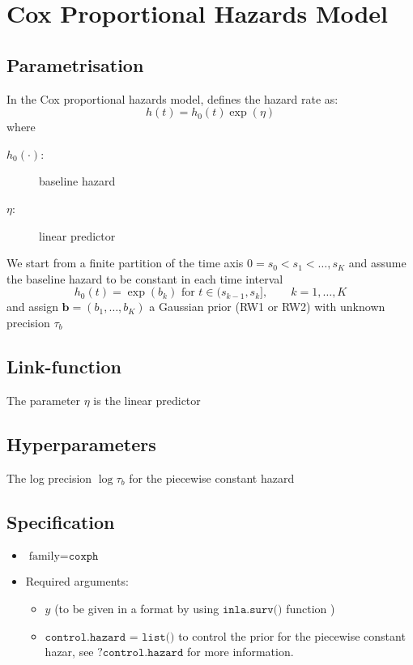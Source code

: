 \documentclass[a4paper,11pt]{article}
\begin{document}
\section*{Cox Proportional Hazards Model}

\subsection*{Parametrisation}

In the Cox proportional hazards model, defines the hazard rate as:
\begin{displaymath}
    h(t) = h_{0}(t)\exp(\eta)
\end{displaymath}
where
\begin{description}
\item[$h_{0}(\cdot)$:] baseline hazard
\item[$\eta$:] linear predictor
\end{description}

We start from a finite partition of the time axis
$0=s_{0}<s_{1}<\dots,s_{K}$ and assume the baseline hazard to be
constant in each time interval
\[
h_{0}(t) = \exp(b_{k})\mbox{ for }t\in(s_{k-1},s_{k}],\qquad
k=1,\dots,K
\]
and assign $\mathbf{b} = (b_{1},\dots,b_{K})$ a Gaussian prior (RW1 or
RW2) with unknown precision $\tau_{b}$
\subsection*{Link-function}

The parameter $\eta$ is the linear predictor

\subsection*{Hyperparameters}

The log precision $\log\tau_{b}$ for the piecewise constant hazard
\subsection*{Specification}

\begin{itemize}
\item $\text{family}=\texttt{coxph}$
\item Required arguments:
    \begin{itemize}
    \item $y$ (to be given in a format by using $\texttt{inla.surv()}$
        function )
    \item $\texttt{control.hazard = list()}$ to control the prior for
        the piecewise constant hazar, see $\texttt{?control.hazard}$
        for more information.
    \end{itemize}
\end{itemize}
\end{document}
